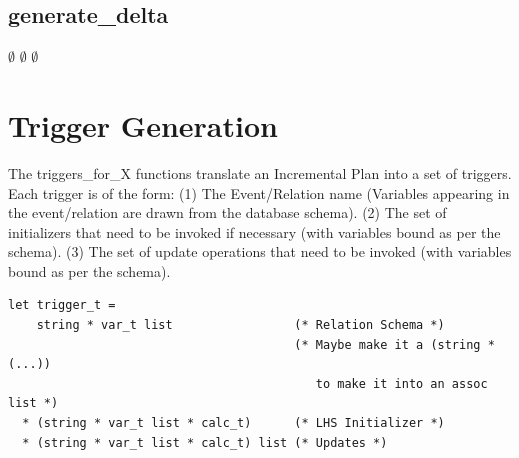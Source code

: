 \documentclass[11pt]{amsart}
\begin{document}
\subsection{generate\_delta}
\begin{algorithmic}
  \RETURN $\emptyset$
  \RETURN $\emptyset$
   
  \RETURN $\emptyset$
\ENDIF

\end{algorithmic}

\section{Trigger Generation}

The triggers\_for\_X functions translate an Incremental Plan into a set of triggers.  Each trigger is of the form: (1) The Event/Relation name (Variables appearing in the event/relation are drawn from the database schema).  (2) The set of initializers that need to be invoked if necessary (with variables bound as per the schema).  (3) The set of update operations that need to be invoked (with variables bound as per the schema).

\begin{verbatim}
let trigger_t = 
    string * var_t list                 (* Relation Schema *)
                                        (* Maybe make it a (string * (...))
                                           to make it into an assoc list *)
  * (string * var_t list * calc_t)      (* LHS Initializer *)
  * (string * var_t list * calc_t) list (* Updates *)
\end{verbatim}
\end{document}
